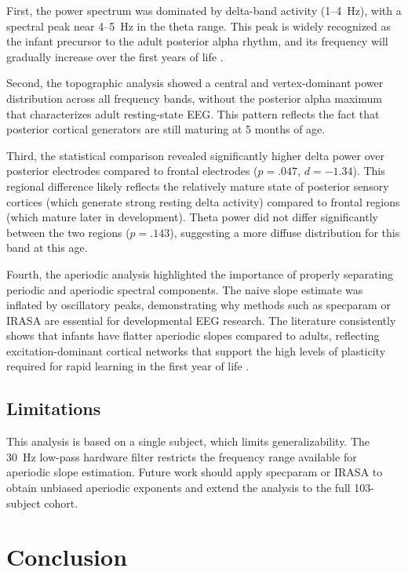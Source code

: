 \documentclass[10pt, a4paper, twocolumn]{article}
\begin{document}
First, the power spectrum was dominated by delta-band activity (1--4~Hz), with a spectral peak near 4--5~Hz in the theta range. This peak is widely recognized as the infant precursor to the adult posterior alpha rhythm, and its frequency will gradually increase over the first years of life \citep{hill2024}.

Second, the topographic analysis showed a central and vertex-dominant power distribution across all frequency bands, without the posterior alpha maximum that characterizes adult resting-state EEG. This pattern reflects the fact that posterior cortical generators are still maturing at 5 months of age.

Third, the statistical comparison revealed significantly higher delta power over posterior electrodes compared to frontal electrodes ($p = .047$, $d = -1.34$). This regional difference likely reflects the relatively mature state of posterior sensory cortices (which generate strong resting delta activity) compared to frontal regions (which mature later in development). Theta power did not differ significantly between the two regions ($p = .143$), suggesting a more diffuse distribution for this band at this age.

Fourth, the aperiodic analysis highlighted the importance of properly separating periodic and aperiodic spectral components. The naive slope estimate was inflated by oscillatory peaks, demonstrating why methods such as specparam or IRASA are essential for developmental EEG research. The literature consistently shows that infants have flatter aperiodic slopes compared to adults, reflecting excitation-dominant cortical networks that support the high levels of plasticity required for rapid learning in the first year of life \citep{gao2017, hill2024, carterleno2024}.

\subsection{Limitations}

This analysis is based on a single subject, which limits generalizability. The 30~Hz low-pass hardware filter restricts the frequency range available for aperiodic slope estimation. Future work should apply specparam or IRASA to obtain unbiased aperiodic exponents and extend the analysis to the full 103-subject cohort.

\section{Conclusion}
\end{document}

